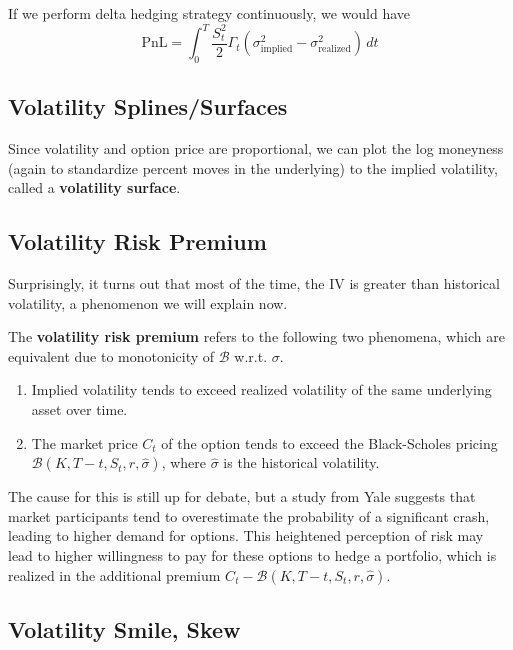 \documentclass{article}
\begin{document}
    If we perform delta hedging strategy continuously, we would have 
    \begin{equation}
      \text{PnL} = \int_0^T \frac{S_t^2}{2} \Gamma_t (\sigma_{\text{implied}}^2 - \sigma_{\text{realized}}^2 )\, dt
    \end{equation}

  \subsection{Volatility Splines/Surfaces}

    Since volatility and option price are proportional, we can plot the log moneyness (again to standardize percent moves in the underlying) to the implied volatility, called a \textbf{volatility surface}. 

  \subsection{Volatility Risk Premium}

    Surprisingly, it turns out that most of the time, the IV is greater than historical volatility, a phenomenon we will explain now. 

    \begin{definition}
      The \textbf{volatility risk premium} refers to the following two phenomena, which are equivalent due to monotonicity of $\mathcal{B}$ w.r.t. $\sigma$. 
      \begin{enumerate}
        \item Implied volatility tends to exceed realized volatility of the same underlying asset over time. 
        \item The market price $C_t$ of the option tends to exceed the Black-Scholes pricing $\mathcal{B}(K, T - t, S_t, r, \hat{\sigma})$, where $\hat{\sigma}$ is the historical volatility. 
      \end{enumerate}
    \end{definition}

    The cause for this is still up for debate, but a study from Yale suggests that market participants tend to overestimate the probability of a significant crash, leading to higher demand for options. This heightened perception of risk may lead to higher willingness to pay for these options to hedge a portfolio, which is realized in the additional premium $C_t - \mathcal{B}(K, T - t, S_t, r, \hat{\sigma})$. 

  \subsection{Volatility Smile, Skew}
\end{document}
